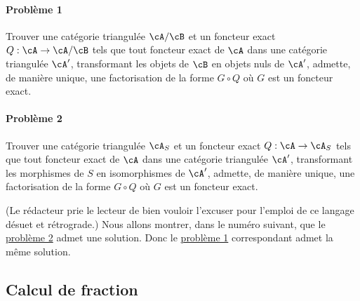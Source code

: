 \paragraph{Probl\`eme 1}
\hypertarget{VIII:prob1}{}
Trouver une cat\'egorie triangul\'ee $\cA/\cB$ et un foncteur exact 
$Q:\cA\to \cA/\cB$ tels que tout foncteur exact de $\cA$ dans une cat\'egorie 
triangul\'ee $\cA'$, transformant les objets de $\cB$ en objets nuls de 
$\cA'$, admette, de mani\`ere unique, une factorisation de la forme $G\circ Q$ 
o\`u $G$ est un foncteur exact. 


\paragraph{Probl\`eme 2}
\hypertarget{VIII:prob2}{}
Trouver une cat\'egorie triangul\'ee $\cA_S$ et un foncteur exact 
$Q:\cA\to \cA_S$ tels que tout foncteur exact de $\cA$ dans une cat\'egorie 
triangul\'ee $\cA'$, transformant les morphismes de $S$ en isomorphismes de 
$\cA'$, admette, de mani\`ere unique, une factorisation de la forme 
$G\circ Q$ o\`u $G$ est un foncteur exact. 

(Le r\'edacteur prie le lecteur de bien vouloir l'excuser pour l'emploi de ce 
langage d\'esuet et r\'etrograde.) Nous allons montrer, dans le num\'ero 
suivant, que le \hyperlink{VIII:prob2}{probl\`eme 2} admet une solution. Donc 
le \hyperlink{VIII:prob1}{probl\`eme 1} correspondant admet la m\^eme solution. 










\subsection{Calcul de fraction}\label{VIII:2-3}





\subsubsection{}\label{VIII:2-3-1}

